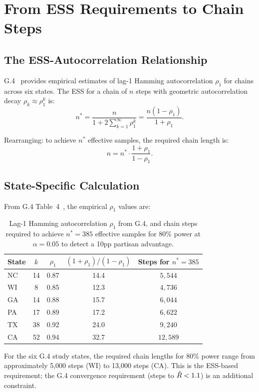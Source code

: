 \section{From ESS Requirements to Chain Steps}
\label{sec:ess}

\subsection{The ESS-Autocorrelation Relationship}

G.4~\citep{g4paper} provides empirical estimates of lag-1 Hamming
autocorrelation $\rho_1$ for \recom{} chains across six states.
The ESS for a chain of $n$ steps with geometric autocorrelation decay
$\rho_k \approx \rho_1^k$ is:
\[
  n^* = \frac{n}{1 + 2\sum_{k=1}^\infty \rho_1^k}
       = \frac{n(1 - \rho_1)}{1 + \rho_1}.
\]

Rearranging: to achieve $n^*$ effective samples, the required chain length is:
\[
  n = n^* \cdot \frac{1 + \rho_1}{1 - \rho_1}.
\]

\subsection{State-Specific Calculation}

From G.4 Table~4~\citep{g4paper}, the empirical $\rho_1$ values are:

\begin{table}[h]
\centering
\caption{Lag-1 Hamming autocorrelation $\rho_1$ from G.4, and chain steps
         required to achieve $n^* = 385$ effective samples for 80\% power
         at $\alpha = 0.05$ to detect a 10pp partisan advantage.}
\label{tab:autocorr}
\begin{tabular}{lcccc}
\toprule
State & $k$ & $\rho_1$ & $(1+\rho_1)/(1-\rho_1)$ & Steps for $n^* = 385$ \\
\midrule
NC & 14 & 0.87 & 14.4 & $5{,}544$ \\
WI &  8 & 0.85 & 12.3 & $4{,}736$ \\
GA & 14 & 0.88 & 15.7 & $6{,}044$ \\
PA & 17 & 0.89 & 17.2 & $6{,}622$ \\
TX & 38 & 0.92 & 24.0 & $9{,}240$ \\
CA & 52 & 0.94 & 32.7 & $12{,}589$ \\
\bottomrule
\end{tabular}
\end{table}

For the six G.4 study states, the required chain lengths for 80\% power
range from approximately 5,000 steps (WI) to 13,000 steps (CA).
This is the ESS-based requirement; the G.4 convergence requirement
(steps to $\hat{R} < 1.1$) is an additional constraint.

